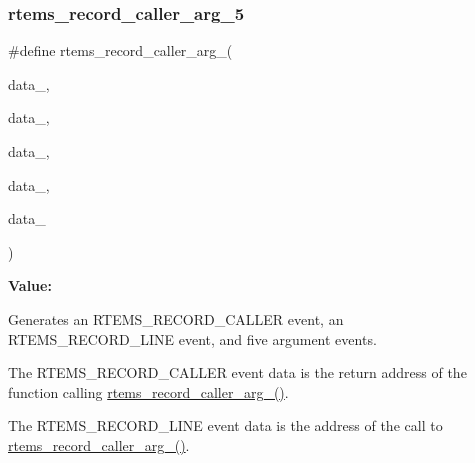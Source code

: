 \subsubsection{\texorpdfstring{rtems\_record\_caller\_arg\_5}{rtems\_record\_caller\_arg\_5}}
{\footnotesize\ttfamily \#define rtems\+\_\+record\+\_\+caller\+\_\+arg\+\_(\begin{DoxyParamCaption}\item[{}]{data\+\_,  }\item[{}]{data\+\_,  }\item[{}]{data\+\_,  }\item[{}]{data\+\_,  }\item[{}]{data\+\_ }\end{DoxyParamCaption})}

{\bfseries Value\+:}
\begin{DoxyCode}{0}
\DoxyCodeLine{  )}

\end{DoxyCode}


Generates an R\+T\+E\+M\+S\+\_\+\+R\+E\+C\+O\+R\+D\+\_\+\+C\+A\+L\+L\+ER event, an R\+T\+E\+M\+S\+\_\+\+R\+E\+C\+O\+R\+D\+\_\+\+L\+I\+NE event, and five argument events. 

The R\+T\+E\+M\+S\+\_\+\+R\+E\+C\+O\+R\+D\+\_\+\+C\+A\+L\+L\+ER event data is the return address of the function calling \mbox{\hyperlink{group__RTEMSRecord_gaed44279a44f73520fc066f6b5f27498e}{rtems\+\_\+record\+\_\+caller\+\_\+arg\+\_()}}.

The R\+T\+E\+M\+S\+\_\+\+R\+E\+C\+O\+R\+D\+\_\+\+L\+I\+NE event data is the address of the call to \mbox{\hyperlink{group__RTEMSRecord_gaed44279a44f73520fc066f6b5f27498e}{rtems\+\_\+record\+\_\+caller\+\_\+arg\+\_()}}.


